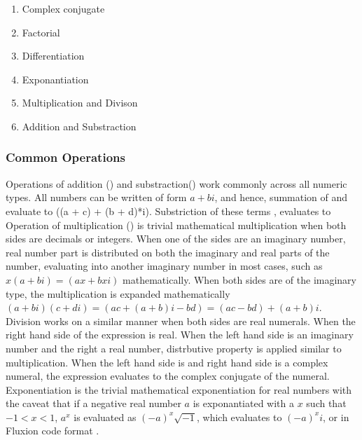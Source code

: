 \documentclass[11pt,a4paper]{book}
\begin{document}
\begin{enumerate}
\item Complex conjugate
\item Factorial
\item Differentiation
\item Exponantiation
\item Multiplication and Divison
\item Addition and Substraction
\end{enumerate}

\subsubsection{Common Operations}

Operations of addition (\code{+}) and substraction(\code{-}) work commonly across all numeric types. All numbers can be written of form $a + bi$, and hence, summation of  and  evaluate to \code((a + c) + (b + d)*i). Substriction of these terms , evaluates to \\

Operation of multiplication (\code{*}) is trivial mathematical multiplication when both sides are decimals or integers. When one of the sides are an imaginary number, real number part is distributed on both the imaginary and real parts of the number, evaluating into another imaginary number in most cases, such as $x(a + bi) = (ax + bxi)$ mathematically. When both sides are of the imaginary type, the multiplication is expanded mathematically $(a + bi)(c + di) = (ac + (a + b)i - bd) = (ac - bd) + (a + b)i$.\\

Division \code{/} works on a similar manner when both sides are real numerals. When the right hand side of the expression is real. When the left hand side is an imaginary number and the right a real number, distrbutive property is applied similar to multiplication. When the left hand side is  and right hand side is a complex numeral, the expression evaluates to the complex conjugate of the numeral.\\

Exponentiation \code{\^} is the trivial mathematical exponentiation for real numbers with the caveat that if a negative real number $a$ is exponantiated with a $x$ such that $-1 < x < 1$, $a^x$ is evaluated as $(-a)^x\sqrt{-1}$, which evaluates to $(-a)^xi$, or in Fluxion code format . \\
\end{document}
